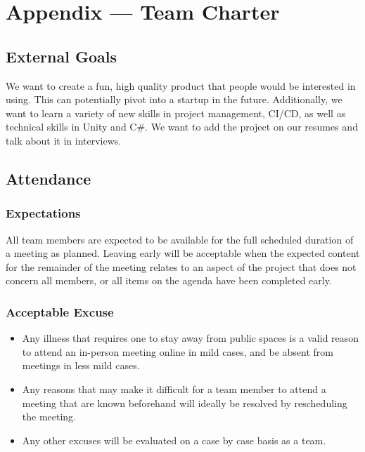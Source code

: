 \documentclass{article}
\begin{document}
\newpage{}

\section*{Appendix --- Team Charter}

\subsection*{External Goals}

We want to create a fun, high quality product that people would be interested in using. This can potentially pivot into a startup in the future. Additionally, we want to learn a variety of new skills in project management, CI/CD, as well as technical skills in Unity and C\#. We want to add the project on our resumes and talk about it in interviews.

\subsection*{Attendance}

\subsubsection*{Expectations}

All team members are expected to be available for the full scheduled duration of a meeting as planned. Leaving early will be acceptable when the expected content for the remainder of the meeting relates to an aspect of the project that does not concern all members, or all items on the agenda have been completed early.

\subsubsection*{Acceptable Excuse}

\begin{itemize}
    \item Any illness that requires one to stay away from public spaces is a valid reason to attend an in-person meeting online in mild cases, and be absent from meetings in less mild cases.
    \item Any reasons that may make it difficult for a team member to attend a meeting that are known beforehand will ideally be resolved by rescheduling the meeting.
    \item Any other excuses will be evaluated on a case by case basis as a team.
\end{itemize}
\end{document}
